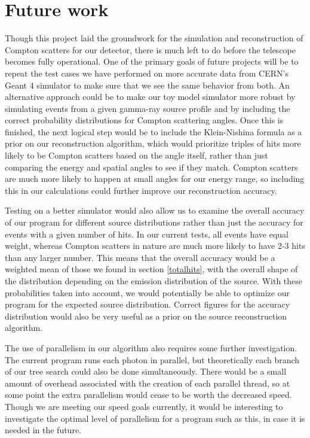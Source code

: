 \section{Future work}
Though this project laid the groundwork for the simulation and reconstruction of Compton scatters for our detector, there is much left to do before the telescope becomes fully operational. One of the primary goals of future projects will be to repeat the test cases we have performed on more accurate data from CERN's Geant 4 simulator to make sure that we see the same behavior from both. An alternative approach could be to make our toy model simulator more robust by simulating events from a given gamma-ray source profile and by including the correct probability distributions for Compton scattering angles. Once this is finished, the next logical step would be to include the Klein-Nishina formula as a prior on our reconstruction algorithm, which would prioritize triples of hits more likely to be Compton scatters based on the angle itself, rather than just comparing the energy and spatial angles to see if they match. Compton scatters are much more likely to happen at small angles for our energy range, so including this in our calculations could further improve our reconstruction accuracy.

Testing on a better simulator would also allow us to examine the overall accuracy of our program for different source distributions rather than just the accuracy for events with a given number of hits. In our current tests, all events have equal weight, whereas Compton scatters in nature are much more likely to have 2-3 hits than any larger number. This means that the overall accuracy would be a weighted mean of those we found in section \ref{totalhits}, with the overall shape of the distribution depending on the emission distribution of the source. With these probabilities taken into account, we would potentially be able to optimize our program for the expected source distribution. Correct figures for the accuracy distribution would also be very useful as a prior on the source reconstruction algorithm.

The use of parallelism in our algorithm also requires some further investigation. The current program runs each photon in parallel, but theoretically each branch of our tree search could also be done simultaneously. There would be a small amount of overhead associated with the creation of each parallel thread, so at some point the extra parallelism would cease to be worth the decreased speed. Though we are meeting our speed goals currently, it would be interesting to investigate the optimal level of parallelism for a program such as this, in case it is needed in the future. 